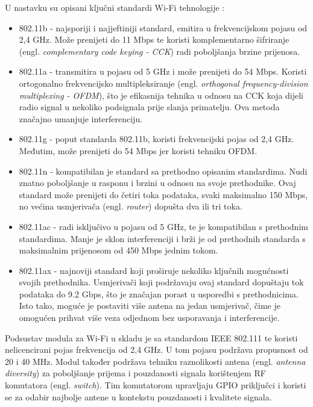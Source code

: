 U nastavku su opisani ključni standardi Wi-Fi tehnologije \cite{how_wifi_works}:
\begin{itemize}
	\item 802.11b - najsporiji i najjeftiniji standard, emitira u frekvencijskom pojasu od 2,4 GHz. Može prenijeti do 11 Mbps te koristi komplementarno šifriranje (engl. \textit{complementary code keying - CCK}) radi poboljšanja brzine prijenosa.
	\item 802.11a - transmitira u pojasu od 5 GHz i može prenijeti do 54 Mbps. Koristi ortogonalno frekvencijsko multipleksiranje (engl. \textit{orthogonal frequency-division multiplexing - OFDM}), što je efikasnija tehnika u odnosu na CCK koja dijeli radio signal u nekoliko podsignala prije slanja primatelju. Ova metoda značajno umanjuje interferenciju. 
	\item 802.11g - poput standarda 802.11b, koristi frekvencijski pojas od 2,4 GHz. Međutim, može prenijeti do 54 Mbps jer koristi tehniku OFDM.
	\item 802.11n - kompatibilan je standard sa prethodno opisanim standardima. Nudi znatno poboljšanje u rasponu i brzini u odnosu na svoje prethodnike. Ovaj standard može prenijeti do četiri toka podataka, svaki maksimalno 150 Mbps, no većina usmjerivača (engl. \textit{router}) dopušta dva ili tri toka.
	\item 802.11ac - radi isključivo u pojasu od 5 GHz, te je kompatibilan s prethodnim standardima. Manje je sklon interferenciji i brži je od prethodnih standarda s maksimalnim prijenosom od 450 Mbps jednim tokom. 
	\item 802.11ax - najnoviji standard koji proširuje nekoliko ključnih mogućnosti svojih prethodnika. Usmjerivači koji podržavaju ovaj standard dopuštaju tok podataka do 9.2 Gbps, što je značajan porast u usporedbi s prethodnicima. Isto tako, moguće je postaviti više antena na jedan usmjerivač, čime je omogućen prihvat više veza odjednom bez usporavanja i interferencije.
\end{itemize}

Podsustav modula za Wi-Fi u skladu je sa standardom IEEE 802.111 te koristi nelicencirani pojas frekvencija od 2,4 GHz. U tom pojasu podržava propusnost od 20 i 40 MHz. Modul također podržava tehniku raznolikosti antena (engl. \textit{antenna diversity}) za poboljšanje prijema i pouzdanosti signala korištenjem RF komutatora (engl. \textit{switch}). Tim komutatorom upravljaju GPIO priključci i koristi se za odabir najbolje antene u kontekstu pouzdanosti i kvalitete signala. \cite{esp_mini}

